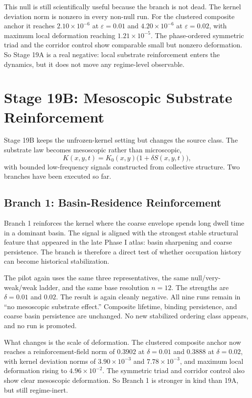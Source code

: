 \documentclass[11pt]{article}
\begin{document}
This null is still scientifically useful because the branch is not dead. The kernel deviation norm is nonzero in every non-null run. For the clustered composite anchor it reaches $2.10\times10^{-6}$ at $\varepsilon=0.01$ and $4.20\times10^{-6}$ at $\varepsilon=0.02$, with maximum local deformation reaching $1.21\times10^{-5}$. The phase-ordered symmetric triad and the corridor control show comparable small but nonzero deformation. So Stage 19A is a real negative: local substrate reinforcement enters the dynamics, but it does not move any regime-level observable.

\section{Stage 19B: Mesoscopic Substrate Reinforcement}

Stage 19B keeps the unfrozen-kernel setting but changes the source class. The substrate law becomes mesoscopic rather than microscopic,
\[
K(x,y,t)=K_0(x,y)\bigl(1+\delta S(x,y,t)\bigr),
\]
with bounded low-frequency signals constructed from collective structure. Two branches have been executed so far.

\subsection{Branch 1: Basin-Residence Reinforcement}

Branch 1 reinforces the kernel where the coarse envelope spends long dwell time in a dominant basin. The signal is aligned with the strongest stable structural feature that appeared in the late Phase I atlas: basin sharpening and coarse persistence. The branch is therefore a direct test of whether occupation history can become historical stabilization.

The pilot again uses the same three representatives, the same null/very-weak/weak ladder, and the same base resolution $n=12$. The strengths are $\delta=0.01$ and $0.02$. The result is again cleanly negative. All nine runs remain in ``no mesoscopic substrate effect.'' Composite lifetime, binding persistence, and coarse basin persistence are unchanged. No new stabilized ordering class appears, and no run is promoted.

What changes is the scale of deformation. The clustered composite anchor now reaches a reinforcement-field norm of $0.3902$ at $\delta=0.01$ and $0.3888$ at $\delta=0.02$, with kernel deviation norms of $3.90\times10^{-3}$ and $7.78\times10^{-3}$, and maximum local deformation rising to $4.96\times10^{-2}$. The symmetric triad and corridor control also show clear mesoscopic deformation. So Branch 1 is stronger in kind than 19A, but still regime-inert.
\end{document}
